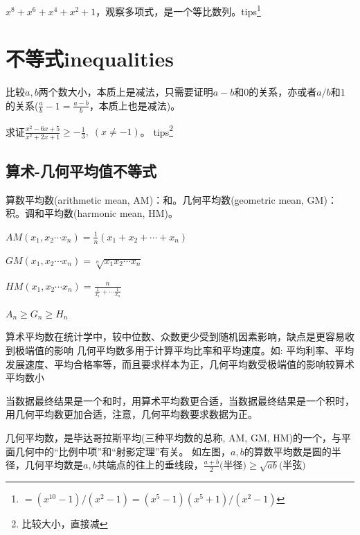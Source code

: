 \documentclass[../main.tex]{subfiles}
\begin{document}
$x^8+x^6+x^4+x^2+1$，观察多项式，是一个等比数列。tips\footnote{$=(x^{10}-1)/(x^2-1)=(x^5-1)(x^5+1)/(x^2-1)$}

\clearpage
\section{不等式inequalities}

比较$a,b$两个数大小，本质上是减法，只需要证明$a-b$和$0$的关系，亦或者$a/b$和$1$的关系($\frac{a}{b}-1=\frac{a-b}{b}$，本质上也是减法)。

求证$\displaystyle \frac{x^2-6x+5}{x^2+2x+1} \ge -\frac{1}{3},\; (x\ne -1)$。
tips\footnote{比较大小，直接减}

\subsection{算术-几何平均值不等式}
 算数平均数(arithmetic mean, AM)：和。几何平均数(geometric mean, GM)：积。调和平均数(harmonic mean, HM)。

 $\displaystyle AM(x_1,x_2\cdots x_n)=\frac{1}{n}(x_1+x_2+\cdots +x_n)$

 $GM(x_1,x_2\cdots x_n)=\sqrt[n]{x_1x_2\cdots x_n}$

 $HM(x_1,x_2\cdots x_n)=\displaystyle \frac{n}{\frac{1}{x_{1}}+\cdots \frac{1}{x_{n}}}$

 $A_n \ge G_n \ge H_n$

 算术平均数在统计学中，较中位数、众数更少受到随机因素影响，缺点是更容易收到极端值的影响
 几何平均数多用于计算平均比率和平均速度。如: 平均利率、平均发展速度、平均合格率等，而且要求样本为正，几何平均数受极端值的影响较算术平均数小

 当数据最终结果是一个和时，用算术平均数更合适，当数据最终结果是一个积时，用几何平均数更加合适，注意，几何平均数要求数据为正。

 \begin{minipage}{0.3\textwidth}
   \centering
 \end{minipage}
 \begin{minipage}{0.7\textwidth}
   几何平均数，是毕达哥拉斯平均(三种平均数的总称, AM, GM, HM)的一个，与平面几何中的“比例中项”和“射影定理”有关。
   如左图，$a,b$的算数平均数是圆的半径，几何平均数是$a,b$共端点的往上的垂线段，$\frac{a+b}{2} \text{(半径)}\ge \sqrt{ab}\text{(半弦)}$
 \end{minipage}
\end{document}
